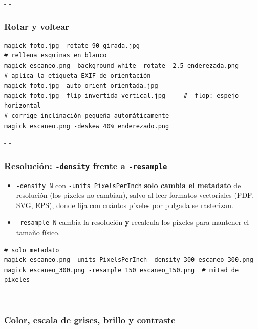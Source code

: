 \documentclass[11pt,a4paper]{article}
\makeatletter
\newcommand{\necesitaespacio}[1]{\par\penalty-100\begingroup
	\setlength{\dimen@}{#1}\dimen@ii\pagegoal\advance\dimen@ii-\pagetotal
	\ifdim\dimen@>\dimen@ii\ifdim\dimen@ii>\z@\vfil\fi\penalty-\@M\fi\endgroup}
\newcommand{\opt}[1]{\texttt{\textcolor{colopt}{#1}}}      %
\makeatother
\begin{document}
	\necesitaespacio{6\baselineskip}
	\subsubsection{Rotar y voltear}
	
	\begin{lstlisting}
magick foto.jpg -rotate 90 girada.jpg
# rellena esquinas en blanco
magick escaneo.png -background white -rotate -2.5 enderezada.png
# aplica la etiqueta EXIF de orientación
magick foto.jpg -auto-orient orientada.jpg
magick foto.jpg -flip invertida_vertical.jpg     # -flop: espejo horizontal
# corrige inclinación pequeña automáticamente
magick escaneo.png -deskew 40% enderezado.png
\end{lstlisting}
	
	\necesitaespacio{6\baselineskip}
	\subsubsection{Resolución: \texttt{-density} frente a \texttt{-resample}}
	
	\begin{itemize}
		\item \opt{-density N} con \opt{-units PixelsPerInch} \textbf{solo cambia el metadato} de resolución (los píxeles no cambian), salvo al leer formatos vectoriales (PDF, SVG, EPS), donde fija con cuántos píxeles por pulgada se rasterizan.
		\item \opt{-resample N} cambia la resolución \textbf{y} recalcula los píxeles para mantener el tamaño físico.
	\end{itemize}
	
	\begin{lstlisting}
# solo metadato
magick escaneo.png -units PixelsPerInch -density 300 escaneo_300.png
magick escaneo_300.png -resample 150 escaneo_150.png  # mitad de píxeles
\end{lstlisting}
	
	\necesitaespacio{34\baselineskip}
	\subsubsection{Color, escala de grises, brillo y contraste}
	
\end{document}
